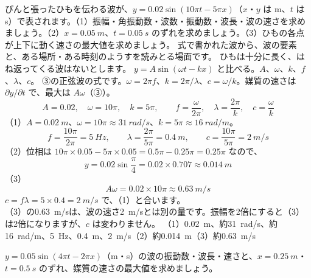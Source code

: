 \label{ph:波-5:ex3}
\begin{phreidai}[正弦波の式を読む]
ぴんと張ったひもを伝わる波が、$y=0.02\sin(10\pi t-5\pi x)$（$x$・$y$ は m、$t$ は s）で表されます。（1）振幅・角振動数・波数・振動数・波長・波の速さを求めましょう。（2）$x=\qty{0.05}{m}$、$t=\qty{0.05}{s}$ のずれを求めましょう。（3）ひもの各点が上下に動く速さの最大値を求めましょう。
\phbamen
式で書かれた波から、波の要素と、ある場所・ある時刻のようすを読みとる場面です。
\phmushi
ひもは十分に長く、はね返ってくる波はないとします。
\phzu
$y=A\sin(\omega t-kx)$ と比べる。$A$、$\omega$、$k$、$f$、$\lambda$、$c$。
\phriyu
③の正弦波の式です。$\omega=2\pi f$、$k=2\pi/\lambda$、$c=\omega/k$。媒質の速さは $\partial y/\partial t$ で、最大は $A\omega$（③）。
\phtateru
\[A=0.02,\quad\omega=10\pi,\quad k=5\pi,\qquad f=\frac{\omega}{2\pi},\quad\lambda=\frac{2\pi}{k},\quad c=\frac{\omega}{k}\]
\phtoku
（1）$A=\qty{0.02}{m}$、$\omega=10\pi\approx\qty{31}{rad/s}$、$k=5\pi\approx\qty{16}{rad/m}$。
\[f=\frac{10\pi}{2\pi}=\qty{5}{Hz},\qquad\lambda=\frac{2\pi}{5\pi}=\qty{0.4}{m},\qquad c=\frac{10\pi}{5\pi}=\qty{2}{m/s}\]
（2）位相は $10\pi\times0.05-5\pi\times0.05=0.5\pi-0.25\pi=0.25\pi$ なので、
\[y=0.02\sin\frac{\pi}{4}=0.02\times0.707\approx\qty{0.014}{m}\]
（3）\[A\omega=0.02\times10\pi\approx\qty{0.63}{m/s}\]
\phtashikame
$c=f\lambda=5\times0.4=\qty{2}{m/s}$ で、（1）と合います。\\
（3）の\qty{0.63}{m/s}は、波の速さ\qty{2}{m/s}とは別の量です。振幅を2倍にすると（3）は2倍になりますが、$c$ は変わりません。
\kotae （1）\qty{0.02}{m}、約\qty{31}{rad/s}、約\qty{16}{rad/m}、\qty{5}{Hz}、\qty{0.4}{m}、\qty{2}{m/s}（2）約\qty{0.014}{m}（3）約\qty{0.63}{m/s}
\end{phreidai}
\begin{jibun}
$y=0.05\sin(4\pi t-2\pi x)$（m・s）の波の振動数・波長・速さと、$x=\qty{0.25}{m}$・$t=\qty{0.5}{s}$ のずれ、媒質の速さの最大値を求めましょう。
\end{jibun}

